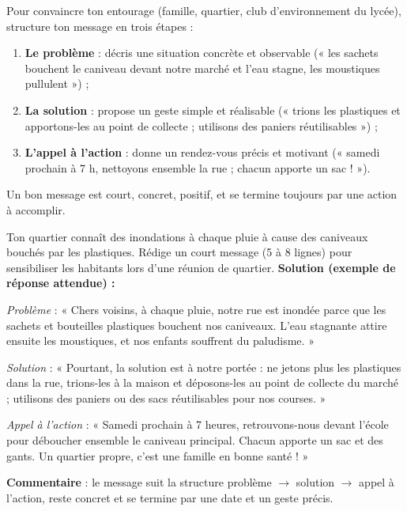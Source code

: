 \documentclass[11pt]{article}
\begin{document}
\begin{methode}
Pour convaincre ton entourage (famille, quartier, club d'environnement du lycée), structure ton message en trois étapes :
\begin{enumerate}
\item \textbf{Le problème} : décris une situation concrète et observable (« les sachets bouchent le caniveau devant notre marché et l'eau stagne, les moustiques pullulent ») ;
\item \textbf{La solution} : propose un geste simple et réalisable (« trions les plastiques et apportons-les au point de collecte ; utilisons des paniers réutilisables ») ;
\item \textbf{L'appel à l'action} : donne un rendez-vous précis et motivant (« samedi prochain à 7 h, nettoyons ensemble la rue ; chacun apporte un sac ! »).
\end{enumerate}
Un bon message est court, concret, positif, et se termine toujours par une action à accomplir.
\end{methode}

\begin{exoresolu}
Ton quartier connaît des inondations à chaque pluie à cause des caniveaux bouchés par les plastiques. Rédige un court message (5 à 8 lignes) pour sensibiliser les habitants lors d'une réunion de quartier.
\tcblower
\textbf{Solution (exemple de réponse attendue) :}

\emph{Problème} : « Chers voisins, à chaque pluie, notre rue est inondée parce que les sachets et bouteilles plastiques bouchent nos caniveaux. L'eau stagnante attire ensuite les moustiques, et nos enfants souffrent du paludisme. »

\emph{Solution} : « Pourtant, la solution est à notre portée : ne jetons plus les plastiques dans la rue, trions-les à la maison et déposons-les au point de collecte du marché ; utilisons des paniers ou des sacs réutilisables pour nos courses. »

\emph{Appel à l'action} : « Samedi prochain à 7 heures, retrouvons-nous devant l'école pour déboucher ensemble le caniveau principal. Chacun apporte un sac et des gants. Un quartier propre, c'est une famille en bonne santé ! »

\textbf{Commentaire} : le message suit la structure problème $\to$ solution $\to$ appel à l'action, reste concret et se termine par une date et un geste précis.
\end{exoresolu}
\end{document}
